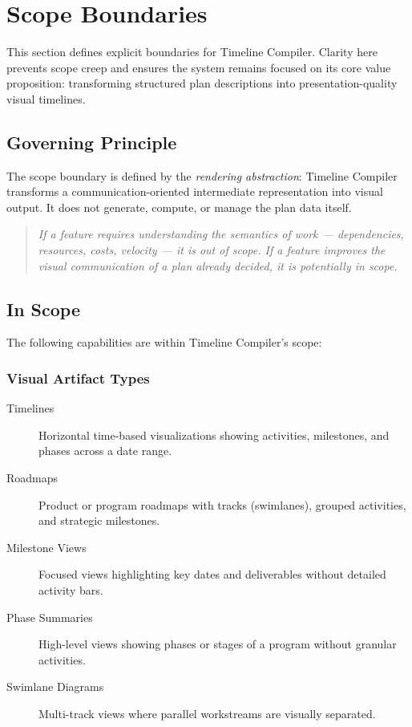 \section{Scope Boundaries}
\label{sec:scope}

This section defines explicit boundaries for Timeline Compiler. Clarity here prevents scope creep and ensures the system remains focused on its core value proposition: transforming structured plan descriptions into presentation-quality visual timelines.

\subsection{Governing Principle}

The scope boundary is defined by the \emph{rendering abstraction}: Timeline Compiler transforms a communication-oriented intermediate representation into visual output. It does not generate, compute, or manage the plan data itself.

\begin{quote}
\emph{If a feature requires understanding the semantics of work — dependencies, resources, costs, velocity — it is out of scope. If a feature improves the visual communication of a plan already decided, it is potentially in scope.}
\end{quote}

\subsection{In Scope}

The following capabilities are within Timeline Compiler's scope:

\subsubsection{Visual Artifact Types}

\begin{description}
  \item[Timelines] Horizontal time-based visualizations showing activities, milestones, and phases across a date range.
  
  \item[Roadmaps] Product or program roadmaps with tracks (swimlanes), grouped activities, and strategic milestones.
  
  \item[Milestone Views] Focused views highlighting key dates and deliverables without detailed activity bars.
  
  \item[Phase Summaries] High-level views showing phases or stages of a program without granular activities.
  
  \item[Swimlane Diagrams] Multi-track views where parallel workstreams are visually separated.
\end{description}

